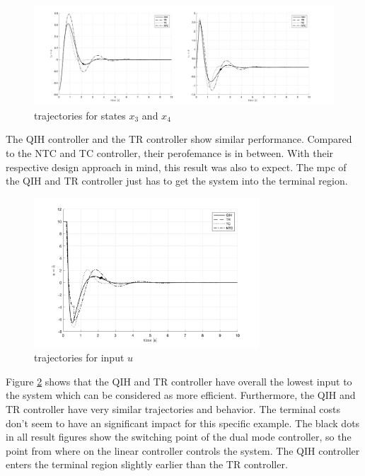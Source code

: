 \documentclass[10pt,a4paper]{article}
\begin{document}
\begin{figure}[h]
	\begin{center}
		\includegraphics[width=\textwidth]{img/bb_time_x3x4.png}
		\caption{trajectories for states $x_3$ and $x_4$}
		\label{pic:bb_time_x3x4}
	\end{center}
\end{figure}

The QIH controller and the TR controller show similar performance. Compared to the NTC and TC controller, their perofemance is in between. With their respective 
design approach in mind, this result was also to expect. The \gls{mpc} of the QIH and TR controller just has to get the system into the terminal region.

\begin{figure}[h]
	\begin{center}
		\includegraphics[width=0.75\textwidth]{img/bb_time_u.png}
		\caption{trajectories for input $u$}
		\label{pic:bb_time_u}
	\end{center}
\end{figure}

Figure \ref{pic:bb_time_u} shows that the QIH and TR controller have overall the lowest input to the system which can be considered as more efficient. 
Furthermore, the QIH and TR controller have very similar
trajectories and behavior. The terminal costs don't seem to have an significant impact for this specific example. The black dots in all result figures show the
switching point of the dual mode controller, so the point from where on the linear controller controls the system. The QIH controller enters the terminal region
slightly earlier than the TR controller. 
\end{document}
